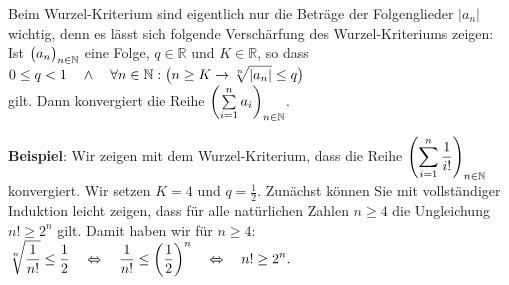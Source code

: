 \remark
Beim Wurzel-Kriterium sind eigentlich nur die Betr\"age der
Folgenglieder $|a_n|$ wichtig, denn es l\"asst sich folgende Versch\"arfung des
Wurzel-Kriteriums zeigen:  
Ist $\bigl(a_n\bigr)_{n\in\mathbb{N}}$ eine Folge, $q\in\mathbb{R}$ und $K \in \mathbb{R}$, so dass 
\\[0.2cm]
\hspace*{1.3cm}
$\displaystyle 0 \leq q < 1 \quad \wedge \quad \forall n \in \mathbb{N}: \bigl(n \geq K \rightarrow \sqrt[n]{|a_n|} \leq q\bigr)$
\\[0.2cm]
gilt.  Dann konvergiert die Reihe $\left(\sum\limits_{i=1}^n a_i\right)_{n\in\mathbb{N}}$.


\noindent
\textbf{Beispiel}: Wir zeigen mit dem Wurzel-Kriterium, dass die Reihe
$\displaystyle\left(\sum\limits_{i=1}^n \frac{1}{i!}\right)_{n\in\mathbb{N}}$konvergiert.  Wir setzen
$K = 4$ und $q = \frac{1}{2}$.  Zun\"achst k\"onnen Sie mit vollst\"andiger Induktion
leicht zeigen, dass f\"ur alle nat\"urlichen Zahlen $n\geq 4$ die Ungleichung
$n! \geq 2^n$ gilt.  Damit haben wir f\"ur $n\geq 4$:
\\[0.2cm]
\hspace*{1.3cm}
$\displaystyle \sqrt[n]{\frac{1}{n!}} \leq \frac{1}{2}     \quad \Leftrightarrow \quad
   \frac{1}{n!} \leq \left(\frac{1}{2}\right)^n  \quad \Leftrightarrow \quad
   n! \geq 2^n. 
$


